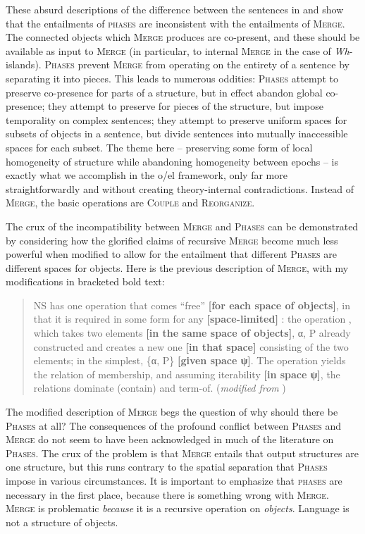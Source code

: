     These absurd descriptions of the difference between the sentences in  and  show that the entailments of  \textsc{phases} are inconsistent with the entailments of \textsc{Merge}. The connected objects which \textsc{Merge} produces are co-present, and these should be available as input to \textsc{Merge} (in particular, to internal \textsc{Merge} in the case of \textit{Wh}-islands). \textsc{Phases} prevent \textsc{Merge} from operating on the entirety of a sentence by separating it into pieces. This leads to numerous oddities: \textsc{Phases} attempt to preserve co-presence for parts of a structure, but in effect abandon global co-presence; they attempt to preserve  for pieces of the structure, but impose temporality on complex sentences; they attempt to preserve uniform spaces for subsets of objects in a sentence, but divide sentences into mutually inaccessible spaces for each subset. The theme here -- preserving some form of local homogeneity of structure while abandoning homogeneity between epochs -- is exactly what we accomplish in the o/el framework, only far more straightforwardly and without creating theory-internal contradictions. Instead of \textsc{Merge}, the basic operations are \textsc{Couple} and \textsc{Reorganize}.

  The crux of the incompatibility between \textsc{Merge} and \textsc{Phases} can be demonstrated by considering how the glorified claims of recursive \textsc{Merge} become much less powerful when modified to allow for the entailment that different \textsc{Phases} are different spaces for objects. Here is the previous description of \textsc{Merge}, with my modifications in bracketed bold text:

\begin{quote} 
NS has one operation that comes “free” \textbf{[for each space of objects]}, in that it is required in some form for any \textbf{[space-limited]} : the operation , which takes two elements \textbf{[in the same space of objects]}, α, P already constructed and creates a new one \textbf{[in that space]} consisting of the two elements; in the simplest, \{α, P\} \textbf{[given space ψ]}. The operation yields the relation of membership, and assuming iterability \textbf{[in space ψ]}, the relations dominate (contain) and term-of. (\textit{modified from} \citep[6]{Chomsky2001beyond})
\end{quote}

  The modified description of \textsc{Merge} begs the question of why should there be \textsc{Phases} at all? The consequences of the profound conflict between \textsc{Phases} and \textsc{Merge} do not seem to have been acknowledged in much of the literature on \textsc{Phases}. The crux of the problem is that \textsc{Merge} entails that output structures are one structure, but this runs contrary to the spatial separation that \textsc{Phases} impose in various circumstances. It is important to emphasize that \textsc{phases} are necessary in the first place, because there is something wrong with \textsc{Merge}. \textsc{Merge} is problematic \textit{because} it is a recursive operation on \textit{objects}. Language is not a structure of objects.

